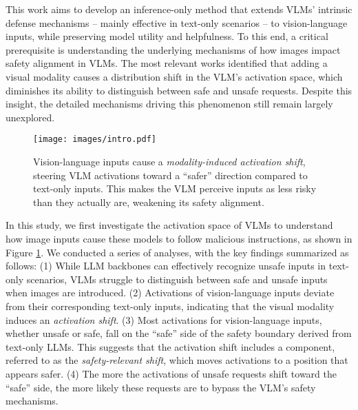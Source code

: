 This work aims to develop an inference-only method that extends VLMs' intrinsic defense mechanisms -- mainly effective in text-only scenarios -- to vision-language inputs, while preserving model utility and helpfulness. To this end, a critical prerequisite is understanding the underlying mechanisms of how images impact safety alignment in VLMs. The most relevant  
works \cite{liu2024unraveling, guo2024vllm} identified that adding a visual modality causes a distribution shift in the VLM's activation space, which diminishes its ability to distinguish between safe and unsafe requests. Despite this insight, the detailed mechanisms driving this phenomenon still remain largely unexplored.

\begin{figure}[t] 
\begin{center}
    \texttt{[image: images/intro.pdf]}
\end{center}
\vspace{-5pt}
\caption{Vision-language inputs cause a \emph{modality-induced activation shift}, steering VLM activations toward a “safer” direction compared to text-only inputs. This makes the VLM perceive inputs as less risky than they actually are, weakening its safety alignment.}
\vspace{-15pt}
\label{fig:intro}
\end{figure}


In this study, we first investigate the activation space of VLMs to understand how image inputs cause these models to follow malicious instructions, as shown in Figure \ref{fig:intro}. We conducted a series of analyses, with the key findings summarized as follows: (1) While LLM backbones can effectively recognize unsafe inputs in text-only scenarios, VLMs struggle to distinguish between safe and unsafe inputs when images are introduced. (2) Activations of vision-language inputs deviate from their corresponding text-only inputs, indicating that the visual modality induces an \emph{activation shift}. (3) Most activations for vision-language inputs, whether unsafe or safe, fall on the ``safe'' side of the safety boundary derived from text-only LLMs. This suggests that the activation shift includes a component, referred to as the \emph{safety-relevant shift}, which moves activations to a position that appears safer. (4) The more the activations of unsafe requests shift toward the ``safe'' side, the more likely these requests are to bypass the VLM’s safety mechanisms. 

